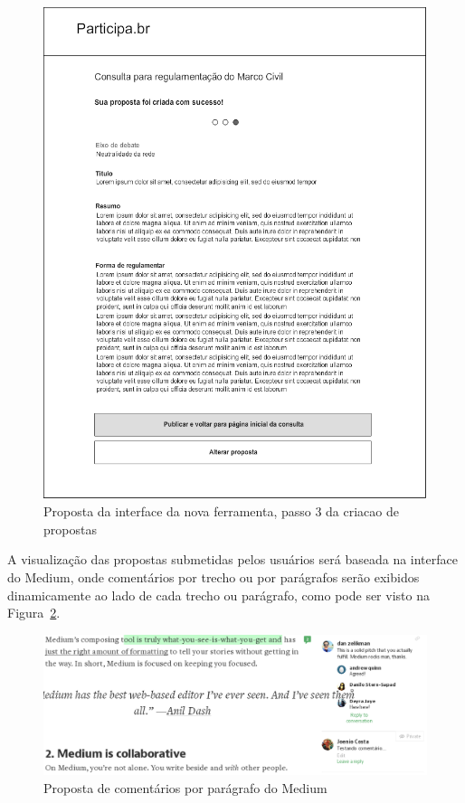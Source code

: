 \documentclass[12pt]{article}
\begin{document}
\begin{figure}[h]
\center
\includegraphics[scale=0.5]{05_-_proposta_passo_final.png}
\caption{Proposta da interface da nova ferramenta, passo 3 da criacao de
propostas}
\label{fig:proposta04}
\end{figure}

A visualização das propostas submetidas pelos usuários será baseada na
interface do Medium\cite{medium}, onde comentários por trecho ou por
parágrafos serão exibidos dinamicamente ao lado de cada trecho ou parágrafo,
como pode ser visto na Figura~\ref{fig:medium}.

\begin{figure}[h]
\center
\includegraphics[scale=0.4]{medium.png}
\caption{Proposta de comentários por parágrafo do Medium}
\label{fig:medium}
\end{figure}
\end{document}
